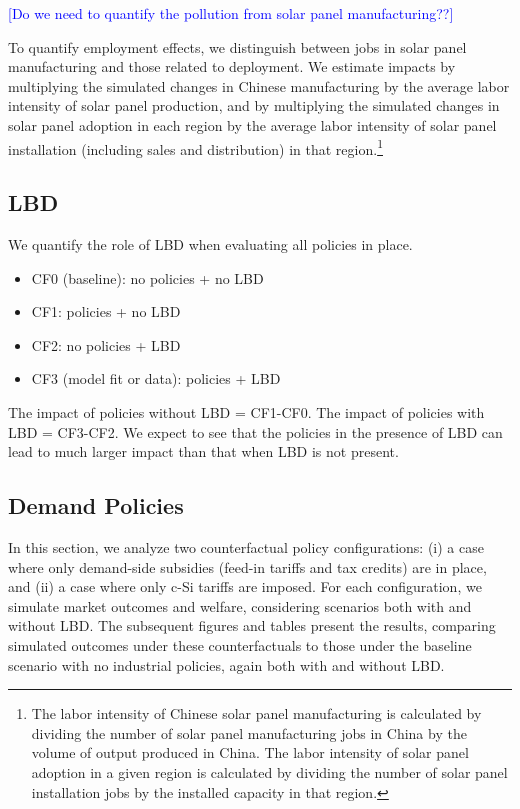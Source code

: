 \documentclass[12pt, letter]{article}
\begin{document}
\textcolor{blue}{[Do we need to quantify the pollution from solar panel manufacturing??]}

To quantify employment effects, we distinguish between jobs in solar panel manufacturing and those related to deployment. We estimate impacts by multiplying the simulated changes in Chinese manufacturing by the average labor intensity of solar panel production, and by multiplying the simulated changes in solar panel adoption in each region by the average labor intensity of solar panel installation (including sales and distribution) in that region.\footnote{The labor intensity of Chinese solar panel manufacturing is calculated by dividing the number of solar panel manufacturing jobs in China by the volume of output produced in China. The labor intensity of solar panel adoption in a given region is calculated by dividing the number of solar panel installation jobs by the installed capacity in that region.}

\subsection{LBD}
We quantify the role of LBD when evaluating all policies in place.
\begin{itemize}
    \item CF0 (baseline): no policies + no LBD
    \item CF1: policies + no LBD
    \item CF2: no policies + LBD
    \item CF3 (model fit or data): policies + LBD
\end{itemize} 

The impact of policies without LBD = CF1-CF0.
The impact of policies with LBD = CF3-CF2.
We expect to see that the policies in the presence of LBD can lead to much larger impact than that when LBD is not present.


\subsection{Demand Policies}
\label{subsec:cf_demand}
In this section, we analyze two counterfactual policy configurations: (i)  a case where only demand-side subsidies (feed-in tariffs and tax credits) are in place, and (ii) a case where only c-Si tariffs are imposed. For each configuration, we simulate market outcomes and welfare, considering scenarios both with and without LBD. The subsequent figures and tables present the results, comparing simulated outcomes under these counterfactuals to those under the baseline scenario with no industrial policies, again both with and without LBD.
\end{document}

